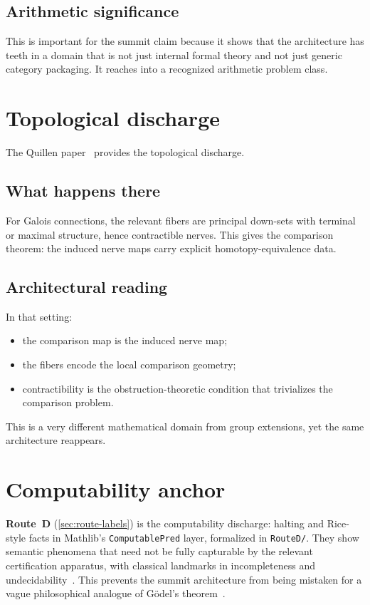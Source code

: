 \documentclass[11pt]{article}
\begin{document}
\subsection{Arithmetic significance}

This is important for the summit claim because it shows that the architecture has
teeth in a domain that is not just internal formal theory and not just generic
category packaging. It reaches into a recognized arithmetic problem class.

\section{Topological discharge}\label{sec:topology}

The Quillen paper~\cite{SpivackQuillen} provides the topological discharge.

\subsection{What happens there}

For Galois connections, the relevant fibers are principal down-sets with terminal
or maximal structure, hence contractible nerves. This gives the comparison theorem:
the induced nerve maps carry explicit homotopy-equivalence data.

\subsection{Architectural reading}

In that setting:
\begin{itemize}
  \item the comparison map is the induced nerve map;
  \item the fibers encode the local comparison geometry;
  \item contractibility is the obstruction-theoretic condition that trivializes
    the comparison problem.
\end{itemize}

This is a very different mathematical domain from group extensions, yet the same
architecture reappears.

\section{Computability anchor}\label{sec:computability}

\textbf{Route~D} (\cref{sec:route-labels}) is the computability discharge: halting and
Rice-style facts in Mathlib's \texttt{ComputablePred} layer, formalized in
\texttt{RouteD/}. They show semantic phenomena that need not be fully capturable by
the relevant certification apparatus, with classical landmarks in incompleteness and
undecidability~\cite{Godel1931,Turing1936,Rice1953}. This prevents the summit
architecture from being mistaken for a vague philosophical analogue of G\"odel's
theorem~\cite{Godel1931}.
\end{document}
